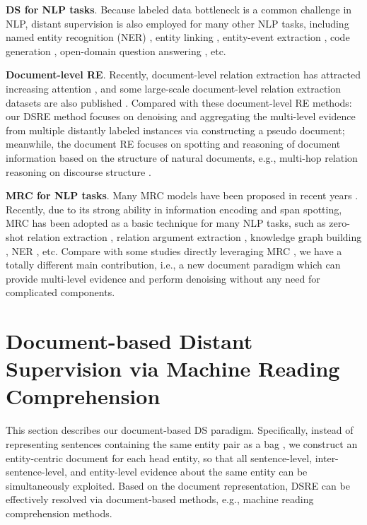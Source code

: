 \documentclass[11pt,a4paper]{article}
\begin{document}
  \textbf{DS for NLP tasks}.
  Because labeled data bottleneck is a common challenge in NLP, distant supervision is also employed for many other NLP tasks, including named entity recognition (NER) \cite{yang_distantly_2018,ghaddar_robust_2018,peng_distantly_2019}, entity linking \cite{le_distant_2019}, entity-event extraction \cite{keith_identifying_2017}, code generation \cite{agashe_juice_2019}, open-domain question answering \cite{lin_denoising_2018}, etc.
  
  \textbf{Document-level RE}.
  Recently, document-level relation extraction has attracted increasing attention \cite{verga_simultaneously_2018,sahu_intersentence_2019,christopoulou_connecting_2019,nan_reasoning_2020}, and some large-scale document-level relation extraction datasets are also published \cite{yao_docred:_2019,wu_renet_2019}.
  Compared with these document-level RE methods:
  our DSRE method focuses on denoising and aggregating the multi-level evidence from multiple distantly labeled instances via constructing a pseudo document; meanwhile, the document RE focuses on spotting and reasoning of document information based on the structure of natural documents, e.g., multi-hop relation reasoning on discourse structure \cite{nan_reasoning_2020}.
  
  \textbf{MRC for NLP tasks}.
  Many MRC models have been proposed in recent years \cite{hermann_teaching_2015,seo_bidirectional_2016, cui_attentionoverattention_2017,chen_reading_2017}.
  Recently, due to its strong ability in information encoding and span spotting, MRC has been adopted as a basic technique for many NLP tasks, such as zero-shot relation extraction \cite{levy_zeroshot_2017a}, relation argument extraction \cite{roth_neural_2018}, knowledge graph building \cite{das_building_2018}, NER \cite{li_unified_2019}, etc.
  Compare with some studies directly leveraging MRC \cite{levy_zeroshot_2017a, das_building_2018}, we have a totally different main contribution, i.e., a new document paradigm which can provide multi-level evidence and perform denoising without any need for complicated components.
  
  \section{Document-based Distant Supervision via Machine Reading Comprehension}
  
  This section describes our document-based DS paradigm. Specifically, instead of representing sentences containing the same entity pair as a bag \cite{lin_neural_2016, ye_distant_2019}, we construct an entity-centric document for each head entity, so that all sentence-level, inter-sentence-level, and entity-level evidence about the same entity can be simultaneously exploited. Based on the document representation, DSRE can be effectively resolved via document-based methods, e.g., machine reading comprehension methods.
  
\end{document}
